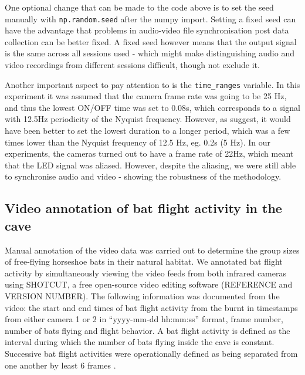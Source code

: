 \documentclass[
]{book}
\begin{document}
One optional change that can be made to the code above is to set the seed manually with \texttt{np.random.seed} after the numpy import.
Setting a fixed seed can have the advantage that problems in audio-video file synchronisation post data collection can be better
fixed. A fixed seed however means that the output signal is the same across all sessions used - which might make distinguishing
audio and video recordings from different sessions difficult, though not exclude it.

Another important aspect to pay attention to is the \texttt{time\_ranges} variable. In this experiment it was assumed that the camera frame rate
was going to be 25 Hz, and thus the lowest ON/OFF time was set to 0.08s, which corresponds to a signal with 12.5Hz periodicity of the Nyquist frequency. However, as \citet{laurijssen2018low} suggest, it would have been better to set the lowest duration to a longer period, which was a few times lower than the Nyquist frequency of 12.5 Hz, eg. 0.2s (5 Hz). In our experiments, the cameras turned out to have a frame rate of 22Hz, which meant that the LED signal was aliased. However, despite the
aliasing, we were still able to synchronise audio and video - showing the robustness of the methodology.

\hypertarget{video-annotation-of-bat-flight-activity-in-the-cave}{%
\subsection{Video annotation of bat flight activity in the cave}\label{video-annotation-of-bat-flight-activity-in-the-cave}}

Manual annotation of the video data was carried out to determine the group sizes of free-flying horseshoe bats in their natural habitat. We annotated bat flight activity by simultaneously viewing the video feeds from both infrared cameras using SHOTCUT, a free open-source video editing software (REFERENCE and VERSION NUMBER). The following information was documented from the video: the start and end times of bat flight activity from the burnt in timestamps from either camera 1 or 2 in ``yyyy-mm-dd hh:mm:ss'' format, frame number, number of bats flying and flight behavior. A bat flight activity is defined as the interval during which the number of bats flying inside the cave is constant. Successive bat flight activities were operationally defined as being separated from one another by least 6 frames .
\end{document}
